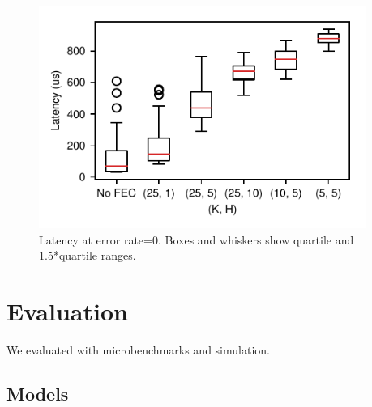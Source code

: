 \begin{figure}[!ht]
\begin{minipage}[b]{0.31\linewidth}
  \centering
  \includegraphics[trim=6mm 6mm 0 0, width=0.95\textwidth]{figures/latency.pdf}
\caption{Latency at error rate=0. Boxes and whiskers show quartile and 1.5*quartile ranges.}
\label{fig:latency}
\end{minipage}
\end{figure}


\section{Evaluation}
\label{sec:evaluation}

We evaluated \OurSys with microbenchmarks and simulation.







\subsection{\OurSys Models}

